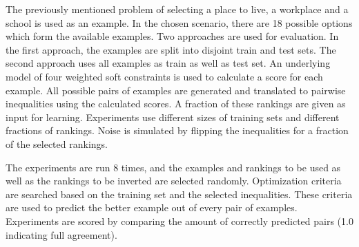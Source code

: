 \documentclass[letterpaper]{article}
\theoremstyle{definition}
\begin{document}
The previously mentioned problem of selecting a place to live, a workplace and a school is used as an example.
In the chosen scenario, there are 18 possible options which form the available examples.
Two approaches are used for evaluation.
In the first approach, the examples are split into disjoint train and test sets.
The second approach uses all examples as train as well as test set.
An underlying model of four weighted soft constraints is used to calculate a score for each example.
All possible pairs of examples are generated and translated to pairwise inequalities using the calculated scores.
A fraction of these rankings are given as input for learning.
Experiments use different sizes of training sets and different fractions of rankings.
Noise is simulated by flipping the inequalities for a fraction of the selected rankings.

The experiments are run 8 times, and the examples and rankings to be used as well as the rankings to be inverted are selected randomly.
Optimization criteria are searched based on the training set and the selected inequalities.
These criteria are used to predict the better example out of every pair of examples.
Experiments are scored by comparing the amount of correctly predicted pairs (1.0 indicating full agreement).
\end{document}
